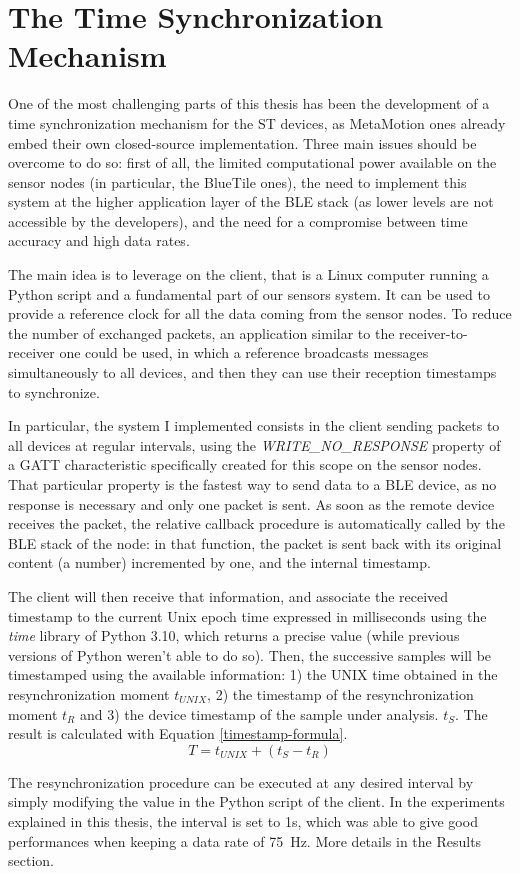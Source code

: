 \section{The Time Synchronization Mechanism}
One of the most challenging parts of this thesis has been the development of a time synchronization mechanism for the ST devices, as MetaMotion ones already embed their own closed-source implementation. Three main issues should be overcome to do so: first of all, the limited computational power available on the sensor nodes (in particular, the BlueTile ones), the need to implement this system at the higher application layer of the BLE stack (as lower levels are not accessible by the developers), and the need for a compromise between time accuracy and high data rates. 

The main idea is to leverage on the client, that is a Linux computer running a Python script and a fundamental part of our sensors system. It can be used to provide a reference clock for all the data coming from the sensor nodes. To reduce the number of exchanged packets, an application similar to the receiver-to-receiver one could be used, in which a reference broadcasts messages simultaneously to all devices, and then they can use their reception timestamps to synchronize.  

In particular, the system I implemented consists in the client sending packets to all devices at regular intervals, using the \textit{WRITE\_NO\_RESPONSE} property of a GATT characteristic specifically created for this scope on the sensor nodes. That particular property is the fastest way to send data to a BLE device, as no response is necessary and only one packet is sent. As soon as the remote device receives the packet, the relative callback procedure is automatically called by the BLE stack of the node: in that function, the packet is sent back with its original content (a number) incremented by one, and the internal timestamp. 

The client will then receive that information, and associate the received timestamp to the current Unix epoch time expressed in milliseconds using the \textit{time} library of Python 3.10, which returns a precise value (while previous versions of Python weren't able to do so). Then, the successive samples will be timestamped using the available information: 1) the UNIX time obtained in the resynchronization moment \(t_{UNIX}\), 2) the timestamp of the resynchronization moment \(t_R\) and 3) the device timestamp of the sample under analysis. \(t_S\). The result is calculated with Equation \ref{timestamp-formula}.
\begin{equation} \label{timestamp-formula}
T = t_{UNIX} + (t_S - t_R) 
\end{equation}

The resynchronization procedure can be executed at any desired interval by simply modifying the value in the Python script of the client. In the experiments explained in this thesis, the interval is set to 1s, which was able to give good performances when keeping a data rate of 75~Hz. More details in the Results section. 